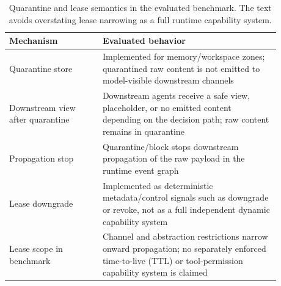 \begin{table}[H]
\centering
\footnotesize
\setlength{\tabcolsep}{3pt}
\renewcommand{\arraystretch}{1.06}
\begin{tabular}{p{0.30\linewidth}p{0.58\linewidth}}
\toprule
Mechanism & Evaluated behavior \\
\midrule
Quarantine store & Implemented for memory/workspace zones; quarantined raw content is not emitted to model-visible downstream channels \\
Downstream view after quarantine & Downstream agents receive a safe view, placeholder, or no emitted content depending on the decision path; raw content remains in quarantine \\
Propagation stop & Quarantine/block stops downstream propagation of the raw payload in the runtime event graph \\
Lease downgrade & Implemented as deterministic metadata/control signals such as downgrade or revoke, not as a full independent dynamic capability system \\
Lease scope in benchmark & Channel and abstraction restrictions narrow onward propagation; no separately enforced time-to-live (TTL) or tool-permission capability system is claimed \\
\bottomrule
\end{tabular}
\caption{Quarantine and lease semantics in the evaluated benchmark. The text avoids overstating lease narrowing as a full runtime capability system.}
\label{tab:quarantine_lease}
\end{table}
